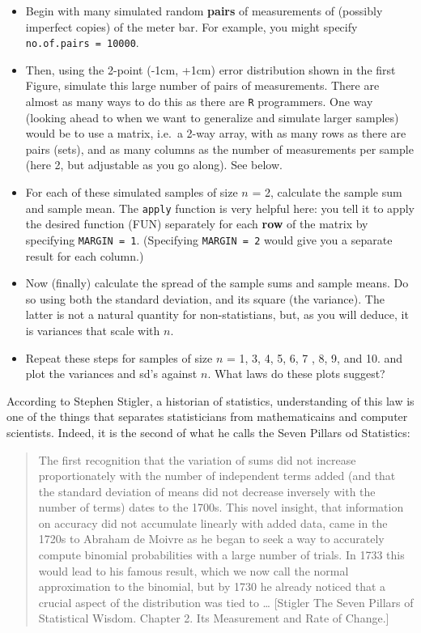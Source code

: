 \documentclass[]{book}
\begin{document}
\begin{enumerate}
  \begin{itemize}
  \item
    Begin with many simulated random \textbf{pairs} of measurements of (possibly imperfect copies) of the meter bar. For example, you might specify \texttt{no.of.pairs\ =\ 10000}.
  \item
    Then, using the 2-point (-1cm, +1cm) error distribution shown in the first Figure, simulate this large number of pairs of measurements. There are almost as many ways to do this as there are \texttt{R} programmers. One way (looking ahead to when we want to generalize and simulate larger samples) would be to use a matrix, i.e.~a 2-way array, with as many rows as there are pairs (sets), and as many columns as the number of measurements per sample (here 2, but adjustable as you go along). See below.
  \item
    For each of these simulated samples of size \(n\) = 2, calculate the sample sum and sample mean. The \texttt{apply} function is very helpful here: you tell it to apply the desired function (FUN) separately for each \textbf{row} of the matrix by specifying \texttt{MARGIN\ =\ 1}. (Specifying \texttt{MARGIN\ =\ 2} would give you a separate result for each column.)
  \item
    Now (finally) calculate the spread of the sample sums and sample means. Do so using both the standard deviation, and its square (the variance). The latter is not a natural quantity for non-statistians, but, as you will deduce, it is variances that scale with \(n\).
  \item
    Repeat these steps for samples of size \(n\) = 1, 3, 4, 5, 6, 7 , 8, 9, and 10. and plot the variances and sd's against \(n.\) What laws do these plots suggest?
  \end{itemize}
\end{enumerate}

According to Stephen Stigler, a historian of statistics, understanding of this law is one of the things that separates statisticians from mathematicains and computer scientists. Indeed, it is the second of what he calls the Seven Pillars od Statistics:

\begin{quote}
The first recognition that the variation of sums did not increase proportionately with the number of independent terms added (and that the standard deviation of means did not decrease inversely with the number of terms) dates to the 1700s. This novel insight, that information on accuracy did not accumulate linearly with added data, came in the 1720s to Abraham de Moivre as he began to seek a way to accurately compute binomial probabilities with a large number of trials. In 1733 this would lead to his famous result, which we now call the normal approximation to the binomial, but by 1730 he already noticed that a crucial aspect of the distribution was tied to \ldots{} {[}Stigler The Seven Pillars of Statistical Wisdom. Chapter 2. Its Measurement and Rate of Change.{]}
\end{quote}
\end{document}
